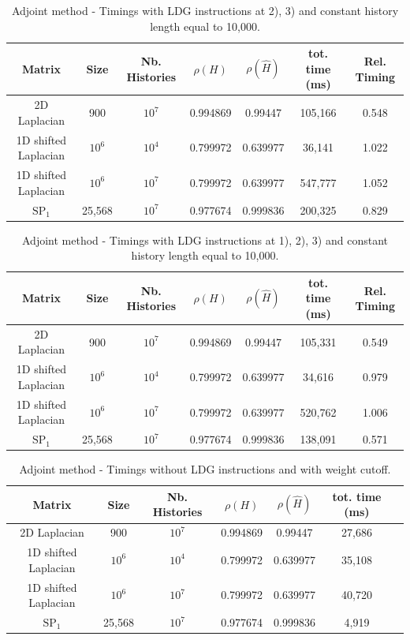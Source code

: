 \documentclass[a4paper,10pt]{article}
\begin{document}
\begin{table}[!h]
\hspace*{-1cm}
\begin{tabular}{|c|c|c|c|c|c|c|}
\hline
\textbf{Matrix} & \textbf{Size} &\textbf{Nb. Histories} & $\rho(H)$ 
& $\rho(\hat{H})$ & tot. time (ms)& Rel. Timing\\
\hline
2D Laplacian& 900 & $10^7$ & 0.994869 & 0.99447 & 105,166 & 0.548\\
\hline 
1D shifted Laplacian& $10^6$ & $10^4$ & 0.799972 & 0.639977 & 36,141 & 1.022\\
\hline
1D shifted Laplacian& $10^6$ & $10^7$ & 0.799972 & 0.639977 & 547,777 & 1.052\\
\hline
$\text{SP}_1$ & 25,568 & $10^7$ & 0.977674 & 0.999836 & 200,325 & 0.829\\
\hline
\end{tabular}
\caption{Adjoint method - Timings with LDG instructions at 2), 3) and constant 
history length 
equal 
to 
10,000.}
\label{tab9}
\end{table}


\begin{table}[!h]
\hspace*{-1cm}
\begin{tabular}{|c|c|c|c|c|c|c|}
\hline
\textbf{Matrix} & \textbf{Size} &\textbf{Nb. Histories} & $\rho(H)$ 
& $\rho(\hat{H})$ & tot. time (ms) & Rel. Timing\\
\hline
2D Laplacian& 900 & $10^7$ & 0.994869 & 0.99447 & 105,331 & 0.549\\
\hline 
1D shifted Laplacian& $10^6$ & $10^4$ & 0.799972 & 0.639977 & 34,616 & 0.979\\
\hline
1D shifted Laplacian& $10^6$ & $10^7$ & 0.799972 & 0.639977 & 520,762 & 1.006\\
\hline
$\text{SP}_1$ & 25,568 & $10^7$ & 0.977674 & 0.999836 & 138,091 & 0.571\\
\hline
\end{tabular}
\caption{Adjoint method - Timings with LDG instructions at 1), 2), 3) and 
constant history 
length 
equal 
to 
10,000.}
\label{tab10}
\end{table}



\begin{table}[!h]
\begin{tabular}{|c|c|c|c|c|c|c|}
\hline
\textbf{Matrix} & \textbf{Size} &\textbf{Nb. Histories} & $\rho(H)$ 
& $\rho(\hat{H})$ & tot. time (ms)\\
\hline
2D Laplacian& 900 & $10^7$ & 0.994869 & 0.99447 & 27,686\\
\hline 
1D shifted Laplacian& $10^6$ & $10^4$ & 0.799972 & 0.639977 & 35,108\\
\hline
1D shifted Laplacian& $10^6$ & $10^7$ & 0.799972 & 0.639977 & 40,720\\
\hline
$\text{SP}_1$ & 25,568 & $10^7$ & 0.977674 & 0.999836 & 4,919\\
\hline
\end{tabular}
\caption{Adjoint method - Timings without LDG instructions and with weight 
cutoff.}
\label{tab11}
\end{table}
\end{document}
